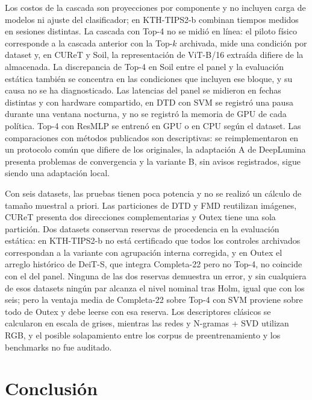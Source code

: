 \documentclass[a4paper,fleqn]{cas-sc}
\begin{document}
Los costos de la cascada son proyecciones por componente y no incluyen carga de modelos ni ajuste del clasificador; en KTH-TIPS2-b combinan tiempos medidos en sesiones distintas. La cascada con Top-4 no se midió en línea: el piloto físico corresponde a la cascada anterior con la Top-$k$ archivada, mide una condición por dataset y, en CUReT y Soil, la representación de ViT-B/16 extraída difiere de la almacenada. La discrepancia de Top-4 en Soil entre el panel y la evaluación estática también se concentra en las condiciones que incluyen ese bloque, y su causa no se ha diagnosticado. Las latencias del panel se midieron en fechas distintas y con hardware compartido, en DTD con SVM se registró una pausa durante una ventana nocturna, y no se registró la memoria de GPU de cada política. Top-4 con ResMLP se entrenó en GPU o en CPU según el dataset. Las comparaciones con métodos publicados son descriptivas: se reimplementaron en un protocolo común que difiere de los originales, la adaptación A de DeepLumina presenta problemas de convergencia y la variante B, sin avisos registrados, sigue siendo una adaptación local.

Con seis datasets, las pruebas tienen poca potencia y no se realizó un cálculo de tamaño muestral a priori. Las particiones de DTD y FMD reutilizan imágenes, CUReT presenta dos direcciones complementarias y Outex tiene una sola partición. Dos datasets conservan reservas de procedencia en la evaluación estática: en KTH-TIPS2-b no está certificado que todos los controles archivados correspondan a la variante con agrupación interna corregida, y en Outex el arreglo histórico de DeiT-S, que integra Completa-22 pero no Top-4, no coincide con el del panel. Ninguna de las dos reservas demuestra un error, y sin cualquiera de esos datasets ningún par alcanza el nivel nominal tras Holm, igual que con los seis; pero la ventaja media de Completa-22 sobre Top-4 con SVM proviene sobre todo de Outex y debe leerse con esa reserva. Los descriptores clásicos se calcularon en escala de grises, mientras las redes y N-gramas + SVD utilizan RGB, y el posible solapamiento entre los corpus de preentrenamiento y los benchmarks no fue auditado.

\section{Conclusión}\label{sec:conclusion}
\end{document}
